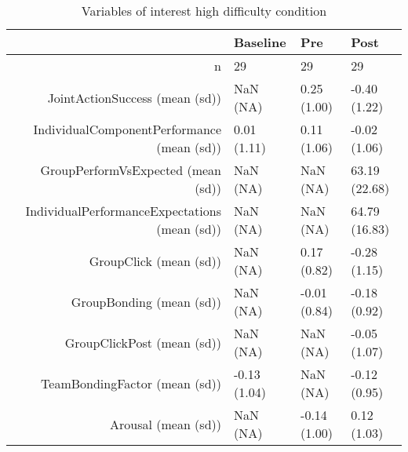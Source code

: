\begin{table}[ht]
\centering
\begin{tabular}{rlll}
  \hline
 & Baseline & Pre & Post \\ 
  \hline
n &    29 &    29 &    29 \\ 
  JointActionSuccess (mean (sd)) &   NaN (NA) &  0.25 (1.00) & -0.40 (1.22) \\ 
  IndividualComponentPerformance (mean (sd)) &  0.01 (1.11) &  0.11 (1.06) & -0.02 (1.06) \\ 
  GroupPerformVsExpected (mean (sd)) &   NaN (NA) &   NaN (NA) & 63.19 (22.68) \\ 
  IndividualPerformanceExpectations (mean (sd)) &   NaN (NA) &   NaN (NA) & 64.79 (16.83) \\ 
  GroupClick (mean (sd)) &   NaN (NA) &  0.17 (0.82) & -0.28 (1.15) \\ 
  GroupBonding (mean (sd)) &   NaN (NA) & -0.01 (0.84) & -0.18 (0.92) \\ 
  GroupClickPost (mean (sd)) &   NaN (NA) &   NaN (NA) & -0.05 (1.07) \\ 
  TeamBondingFactor (mean (sd)) & -0.13 (1.04) &   NaN (NA) & -0.12 (0.95) \\ 
  Arousal (mean (sd)) &   NaN (NA) & -0.14 (1.00) &  0.12 (1.03) \\ 
   \hline
\end{tabular}
\caption{Variables of interest 
 high difficulty condition} 
\label{tab:factorsTimeHigh}
\end{table}
